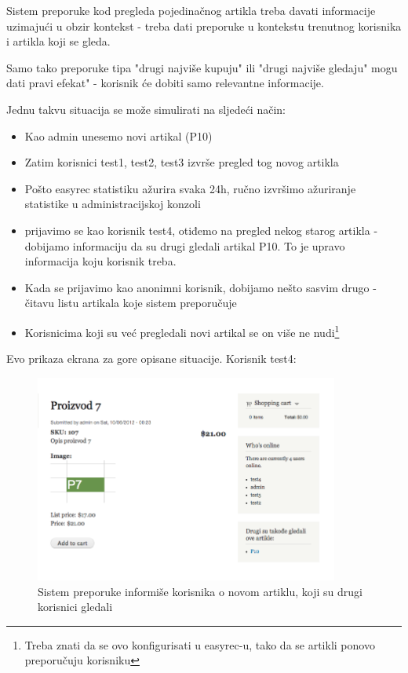\documentclass[times, utf8, seminar]{fit}
\begin{document}
{{Sistem preporuke kod pregleda pojedinačnog artikla treba davati informacije uzimajući u obzir kontekst - treba dati preporuke u kontekstu trenutnog korisnika i artikla koji se gleda.

Samo tako preporuke tipa "drugi najviše kupuju" ili "drugi najviše gledaju" mogu dati pravi efekat" - korisnik će dobiti samo relevantne informacije.

Jednu takvu situacija se može simulirati na sljedeći način:
\begin{itemize}
  \item Kao admin unesemo novi artikal (P10)
  \item Zatim korisnici test1, test2, test3 izvrše pregled tog novog artikla
  \item Pošto easyrec statistiku ažurira svaka 24h, ručno izvršimo ažuriranje statistike u administracijskoj konzoli
  \item prijavimo se kao korisnik test4, otiđemo na pregled nekog starog artikla - dobijamo informaciju da su drugi gledali artikal P10. 
           To je upravo informacija koju korisnik treba.
  \item Kada se prijavimo kao anonimni korisnik, dobijamo nešto sasvim drugo - čitavu listu artikala koje sistem preporučuje
  \item Korisnicima koji su već pregledali novi artikal se on više ne nudi\footnote{Treba znati da se ovo konfigurisati u easyrec-u, tako da se artikli ponovo preporučuju korisniku}
\end{itemize}

Evo prikaza ekrana za gore opisane situacije. Korisnik test4:

\begin{figure}[H]
\centering
\includegraphics[width=10cm]{img/preporuka_pojavio_se_novi_artikal_p10.png}
\caption{Sistem preporuke informiše korisnika o novom artiklu, koji su drugi korisnici gledali}
\end{figure}

}}
\end{document}
